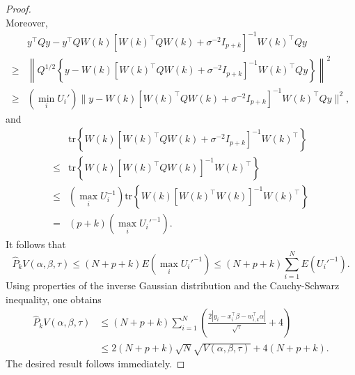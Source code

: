 \documentclass[12pt]{article}
\begin{document}
\begin{proof}
\[		\]
		Moreover,
		\[
		\begin{aligned}
			&y^{\top} Q y - y^{\top} Q W(k) [W(k)^{\top} Q W(k) + \sigma^{-2} I_{p+k}]^{-1} W(k)^{\top} Q y \\
			\geq & \left\|Q^{1/2} \left\{ y -  W(k) [W(k)^{\top} Q W(k) + \sigma^{-2} I_{p+k} ]^{-1} W(k)^{\top} Q y \right\} \right\|^2 \\
			\geq & \left(\min_i U_i' \right) \| y -  W(k) [W(k)^{\top} Q W(k) + \sigma^{-2} I_{p+k} ]^{-1} W(k)^{\top} Q y \|^2,
		\end{aligned}
		\]
		and
		\[
		\begin{aligned}
			&\mbox{tr} \left\{ W(k) [W(k)^{\top} Q W(k) + \sigma^{-2} I_{p+k} ]^{-1} W(k)^{\top} \right\} \\
			\leq & \mbox{tr} \left\{  W(k) [W(k)^{\top} Q W(k) ]^{-1} W(k)^{\top}  \right\} \\
			\leq & \left( \max_i U_i^{-1} \right) \mbox{tr} \left\{   W(k) [W(k)^{\top} W(k) ]^{-1} W(k)^{\top}  \right\} \\
			=& (p+k) \left( \max_i U_i'^{-1} \right).
		\end{aligned}
		\]
		It follows that
		\[
		\hat{P}_k V(\alpha, \beta, \tau) \leq (N+p+k) E \left( \max_i U_i'^{-1} \right) \leq (N+p+k) \sum_{i=1}^N E(U_i'^{-1}).
		\]
		Using properties of the inverse Gaussian distribution and the Cauchy-Schwarz inequality, one obtains
		\[
		\begin{aligned}
			\hat{P}_k V(\alpha, \beta, \tau) &\leq  (N+p+k) \sum_{i=1}^N \left( \frac{2 |y_i - x_i^{\top} \beta - w_{i,k}^{\top} \alpha|}{\sqrt{\tau}} + 4 \right) \\
			&\leq 2 (N+p+k) \sqrt{N} \sqrt{V(\alpha,\beta,\tau)} + 4(N+p+k).
		\end{aligned}
		\]
		The desired result follows immediately.
	\end{proof}
	
\end{document}
